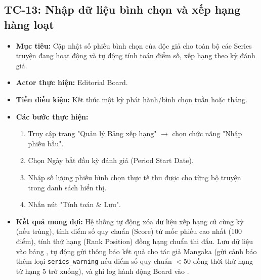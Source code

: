 \subsection{TC-13: Nhập dữ liệu bình chọn và xếp hạng hàng loạt}
\label{subsec:tc13_input_votes}
\begin{itemize}
    \item \textbf{Mục tiêu:} Cập nhật số phiếu bình chọn của độc giả cho toàn bộ các Series truyện đang hoạt động và tự động tính toán điểm số, xếp hạng theo kỳ đánh giá.
    \item \textbf{Actor thực hiện:} Editorial Board.
    \item \textbf{Tiền điều kiện:} Kết thúc một kỳ phát hành/bình chọn tuần hoặc tháng.
    \item \textbf{Các bước thực hiện:}
    \begin{enumerate}
        \item Truy cập trang "Quản lý Bảng xếp hạng" $\rightarrow$ chọn chức năng "Nhập phiếu bầu".
        \item Chọn Ngày bắt đầu kỳ đánh giá (Period Start Date).
        \item Nhập số lượng phiếu bình chọn thực tế thu được cho từng bộ truyện trong danh sách hiển thị.
        \item Nhấn nút "Tính toán \& Lưu".
    \end{enumerate}
    \item \textbf{Kết quả mong đợi:} Hệ thống tự động xóa dữ liệu xếp hạng cũ cùng kỳ (nếu trùng), tính điểm số quy chuẩn (Score) từ mốc phiếu cao nhất (100 điểm), tính thứ hạng (Rank Position) đồng hạng chuẩn thi đấu. Lưu dữ liệu vào bảng , tự động gửi thông báo kết quả cho tác giả Mangaka (gửi cảnh báo thêm loại \texttt{series\_warning} nếu điểm số quy chuẩn $< 50$ đồng thời thứ hạng từ hạng 5 trở xuống), và ghi log hành động Board vào .
\end{itemize}

